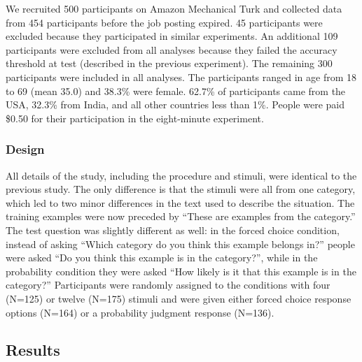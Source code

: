 \documentclass[doc,apacite]{apa6}
\begin{document}
We recruited 500 participants on Amazon Mechanical Turk and collected data from 454 participants before the job posting expired. 45 participants were excluded because they participated in similar experiments. An additional 109 participants were excluded from all analyses because they failed the accuracy threshold at test (described in the previous experiment). The remaining 300 participants were included in all analyses. The participants ranged in age from 18 to 69 (mean 35.0) and 38.3\% were female. 62.7\% of participants came from the USA, 32.3\% from India, and all other countries less than 1\%.
People were paid \$0.50 for their participation in the eight-minute experiment.

\subsubsection{Design}

All details of the study, including the procedure and stimuli, were identical to the previous study. The only difference is that the stimuli were all from one category, which led to two minor differences in the text used to describe the situation. The training examples were now preceded by ``These are examples from the category.'' The test question was slightly different as well: in the {\sc forced choice} condition, instead of asking ``Which category do you think this example belongs in?'' people were asked ``Do you think this example is in the category?'', while in the {\sc probability} condition they were asked ``How likely is it that this example is in the category?''
Participants were randomly assigned to the conditions with {\sc four} (N=125) or {\sc twelve} (N=175) stimuli and were given either {\sc forced choice} response options (N=164) or a {\sc probability} judgment response (N=136).


\subsection{Results}
\end{document}
